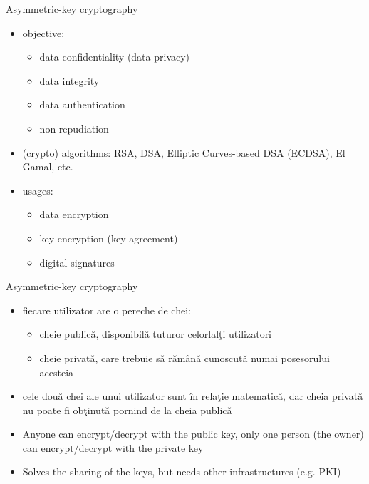 \documentclass[pdf]{beamer}
\begin{document}
\begin{frame}{Asymmetric-key cryptography}
\begin{itemize}
\item
objective:  
\begin{itemize}
\item
data confidentiality (data privacy) 
\item
data integrity
\item
data authentication
\item
non-repudiation
\end{itemize}

\item
(crypto) algorithms: RSA, DSA, Elliptic Curves-based DSA (ECDSA), El Gamal, etc.

\item
usages: 
\begin{itemize}
\item
data encryption
\item
key encryption (key-agreement)
\item
digital signatures
\end{itemize}

\end{itemize}
\end{frame}



\begin{frame}{Asymmetric-key cryptography}
\begin{itemize}
\item
fiecare utilizator are o pereche de chei:
\begin{itemize}
\item
cheie publică, disponibilă tuturor celorlalţi utilizatori
\item
cheie privată, care trebuie să rămână cunoscută numai posesorului acesteia
\end{itemize}
\item
cele două chei ale unui utilizator sunt în relaţie matematică, dar cheia privată nu poate fi obţinută pornind de la cheia publică
\item
Anyone can encrypt/decrypt with the public key, only one person (the owner) can encrypt/decrypt with the private key
\item
Solves the sharing of the keys, but needs other infrastructures (e.g. PKI)
\end{itemize}
\end{frame}
\end{document}
